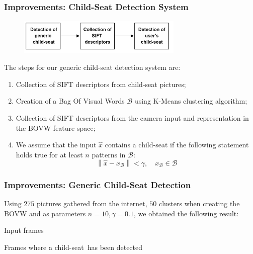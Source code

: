 \documentclass{beamer}
\newcommand{\norm}[1]{\left\lVert#1\right\rVert}
\begin{document}
	\begin{frame}
		\frametitle{Improvements: Child-Seat Detection System}
		\begin{figure}
			\centering
			\includegraphics[width=0.7\textwidth]{img/SIFT_collection.png}
		\end{figure}
		The steps for our generic child-seat detection system are:
		
		\begin{enumerate}
			\item Collection of SIFT descriptors from child-seat pictures;
			\item Creation of a Bag Of Visual Words $\mathcal{B}$ using K-Means clustering algorithm;
			\item Collection of SIFT descriptors from the camera input and representation in the BOVW feature space;
			\item We assume that the input $\hat{x}$ contains a child-seat if the following statement holds true for at least $n$ patterns in $\mathcal{B}$:
				\begin{equation*}
				\norm{\hat{x} - x_{\mathcal{B}}} < \gamma,
				\quad x_{\mathcal{B}} \in \mathcal{B}
				\end{equation*}
		\end{enumerate}		
	\end{frame}

	\begin{frame}
		\frametitle{Improvements: Generic Child-Seat Detection}
		Using $275$ pictures gathered from the internet, $50$ clusters when creating the BOVW and as parameters $n=10, \gamma=0.1$, we obtained the following result:
		
		\bigskip
		
		\begin{minipage}{0.5\textwidth}
			\begin{center}
				{\small Input frames}
			\end{center}
		\end{minipage}%
		\begin{minipage}{0.5\textwidth}
			\begin{center}
				\begin{small}
					Frames where a child-seat\
					has been detected
				\end{small}
			\end{center}
		\end{minipage}
	
		\bigskip
		
		\includemedia[width=\textwidth,
					 addresource=videos/detection.mp4,
					 transparent,
					 activate=pagevisible,
					 flashvars={
					 	source=videos/detection.mp4
						&autoplay=true
						&loop=false}]
		{\textcolor{white}{Video}}{VPlayer9.swf}
	\end{frame}
\end{document}
